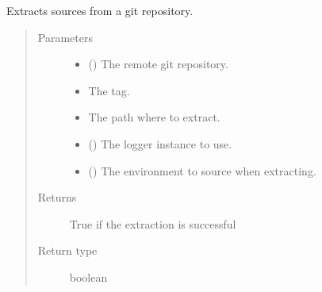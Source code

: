 \documentclass[a4paper,10pt,english]{sphinxmanual}
\begin{document}

\begin{fulllineitems}
\label{\detokenize{commands/apidoc/src:src.system.git_extract}}
Extracts sources from a git repository.
\begin{quote}\begin{description}
\item[{Parameters}] \leavevmode\begin{itemize}
\item {} 
 () \textendash{} The remote git repository.

\item {} 
 \textendash{} The tag.

\item {} 
 \textendash{} The path where to extract.

\item {} 
 () \textendash{} The logger instance to use.

\item {} 
 () \textendash{} The environment to source when
extracting.

\end{itemize}

\item[{Returns}] \leavevmode
True if the extraction is successful

\item[{Return type}] \leavevmode
boolean

\end{description}\end{quote}

\end{fulllineitems}

\end{document}
